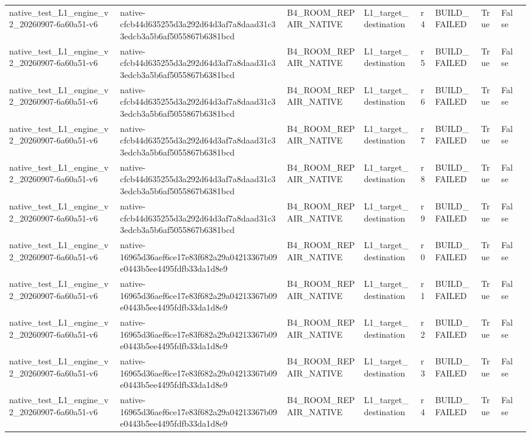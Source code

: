 \begin{tabular}{lllllllll}
native\_test\_L1\_engine\_v2\_20260907-6a60a51-v6 & native-cfcb44d635255d3a292d64d3af7a8daad31c33edcb3a5b6af5055867b6381bcd & B4\_ROOM\_REPAIR\_NATIVE & L1\_target\_destination & r4 & BUILD\_FAILED & True & False &  \\
native\_test\_L1\_engine\_v2\_20260907-6a60a51-v6 & native-cfcb44d635255d3a292d64d3af7a8daad31c33edcb3a5b6af5055867b6381bcd & B4\_ROOM\_REPAIR\_NATIVE & L1\_target\_destination & r5 & BUILD\_FAILED & True & False &  \\
native\_test\_L1\_engine\_v2\_20260907-6a60a51-v6 & native-cfcb44d635255d3a292d64d3af7a8daad31c33edcb3a5b6af5055867b6381bcd & B4\_ROOM\_REPAIR\_NATIVE & L1\_target\_destination & r6 & BUILD\_FAILED & True & False &  \\
native\_test\_L1\_engine\_v2\_20260907-6a60a51-v6 & native-cfcb44d635255d3a292d64d3af7a8daad31c33edcb3a5b6af5055867b6381bcd & B4\_ROOM\_REPAIR\_NATIVE & L1\_target\_destination & r7 & BUILD\_FAILED & True & False &  \\
native\_test\_L1\_engine\_v2\_20260907-6a60a51-v6 & native-cfcb44d635255d3a292d64d3af7a8daad31c33edcb3a5b6af5055867b6381bcd & B4\_ROOM\_REPAIR\_NATIVE & L1\_target\_destination & r8 & BUILD\_FAILED & True & False &  \\
native\_test\_L1\_engine\_v2\_20260907-6a60a51-v6 & native-cfcb44d635255d3a292d64d3af7a8daad31c33edcb3a5b6af5055867b6381bcd & B4\_ROOM\_REPAIR\_NATIVE & L1\_target\_destination & r9 & BUILD\_FAILED & True & False &  \\
native\_test\_L1\_engine\_v2\_20260907-6a60a51-v6 & native-16965d36aef6ce17e83f682a29a04213367b09e0443b5ee4495fdfb33da1d8e9 & B4\_ROOM\_REPAIR\_NATIVE & L1\_target\_destination & r0 & BUILD\_FAILED & True & False &  \\
native\_test\_L1\_engine\_v2\_20260907-6a60a51-v6 & native-16965d36aef6ce17e83f682a29a04213367b09e0443b5ee4495fdfb33da1d8e9 & B4\_ROOM\_REPAIR\_NATIVE & L1\_target\_destination & r1 & BUILD\_FAILED & True & False &  \\
native\_test\_L1\_engine\_v2\_20260907-6a60a51-v6 & native-16965d36aef6ce17e83f682a29a04213367b09e0443b5ee4495fdfb33da1d8e9 & B4\_ROOM\_REPAIR\_NATIVE & L1\_target\_destination & r2 & BUILD\_FAILED & True & False &  \\
native\_test\_L1\_engine\_v2\_20260907-6a60a51-v6 & native-16965d36aef6ce17e83f682a29a04213367b09e0443b5ee4495fdfb33da1d8e9 & B4\_ROOM\_REPAIR\_NATIVE & L1\_target\_destination & r3 & BUILD\_FAILED & True & False &  \\
native\_test\_L1\_engine\_v2\_20260907-6a60a51-v6 & native-16965d36aef6ce17e83f682a29a04213367b09e0443b5ee4495fdfb33da1d8e9 & B4\_ROOM\_REPAIR\_NATIVE & L1\_target\_destination & r4 & BUILD\_FAILED & True & False &  \\

\end{tabular}
